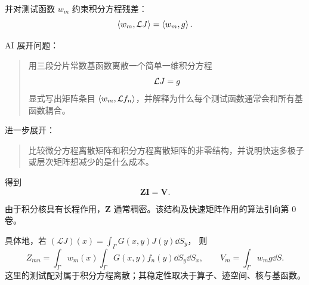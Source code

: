 并对测试函数 \(w_m\) 约束积分方程残差：
\[
\left\langle w_m,\mathcal L J\right\rangle
=
\left\langle w_m,g\right\rangle.
\]

\begin{askai}
AI 展开问题：
\begin{quote}
用三段分片常数基函数离散一个简单一维积分方程
\[
\mathcal L J=g
\]
显式写出矩阵条目 \(\left\langle w_m,\mathcal L f_n\right\rangle\)，并解释为什么每个测试函数通常会和所有基函数耦合。
\end{quote}

进一步展开：
\begin{quote}
比较微分方程离散矩阵和积分方程离散矩阵的非零结构，并说明快速多极子或层次矩阵想减少的是什么成本。
\end{quote}
\end{askai}

得到
\[
\bm Z\bm I=\bm V.
\]

由于积分核具有长程作用，$\bm Z$ 通常稠密。该结构及快速矩阵作用的算法引向第 0 卷。

具体地，若 $(\mathcal LJ)(x)=\int_\Gamma G(x,y)J(y)\dd S_y$，
则
\[
Z_{mn}=\int_\Gamma w_m(x)\int_\Gamma G(x,y)f_n(y)\dd S_y\dd S_x,\qquad
V_m=\int_\Gamma w_mg\dd S.
\]
这里的测试配对属于积分方程离散；其稳定性取决于算子、迹空间、核与基函数。
